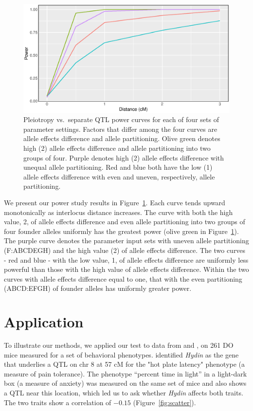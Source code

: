 \documentclass[12pt,twoside, lineno]{gsajnl}
\begin{document}
\begin{figure}
\includegraphics[width = \textwidth]{../R/power-curves.eps}
\caption{Pleiotropy vs.\ separate QTL power curves for each of four
  sets of parameter settings. Factors that differ among the four
  curves are allele effects difference and allele partitioning. Olive
  green denotes high (2) allele effects difference and allele
  partitioning into two groups of four. Purple denotes high (2) allele
  effects difference with unequal allele partitioning. Red and blue
  both have the low (1) allele effects difference with even and
  uneven, respectively, allele partitioning.}
\label{fig:power}
\end{figure}

We present our power study results in Figure~\ref{fig:power}. Each
curve tends upward monotonically as interlocus distance increases. The
curve with both the high value, 2, of allele effects difference and
even allele partitioning into two groups of four founder alleles
uniformly has the greatest power (olive green in Figure~\ref{fig:power}).
The purple curve denotes the parameter input sets
with uneven allele partitioning (F:ABCDEGH) and the high value (2) of
allele effects difference. The two curves - red and blue - with the
low value, 1, of allele effects difference are uniformly less powerful
than those with the high value of allele effects difference. Within
the two curves with allele effects difference equal to one, that with
the even partitioning (ABCD:EFGH) of founder alleles has uniformly
greater power.


\section{Application}
\label{sec:app}

To illustrate our methods, we applied our test to data from
\citet{logan2013high} and \citet{recla2014precise}, on 261 DO mice
measured for a set of behavioral phenotypes.
\citet{recla2014precise} identified \textit{Hydin} as the gene that
underlies a QTL on chr 8 at 57 cM for the "hot plate latency"
phenotype (a measure of pain tolerance). The phenotype ``percent time in light''
in a light-dark box (a measure of anxiety) was
measured on the same set of mice \citep{logan2013high} and also shows a QTL near
this location, which led us to ask whether \textit{Hydin} affects both traits.
The two traits show a correlation of $-0.15$ (Figure~\ref{fig:scatter}).
\end{document}

